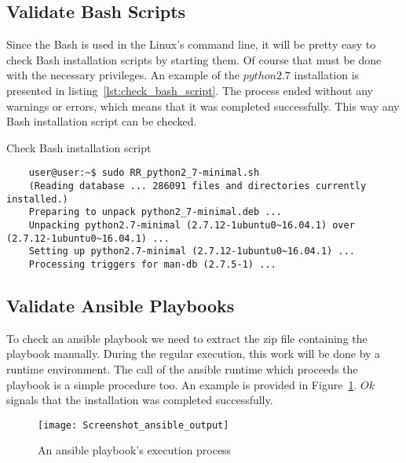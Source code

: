 \subsection*{Validate Bash Scripts}
Since the Bash is used in the Linux's command line, it will be pretty easy to check Bash installation scripts by starting them.
Of course that must be done with the necessary privileges.
An example of the $python2.7$ installation is presented in listing~\ref{lst:check_bash_script}. %
The process ended without any warnings or errors, which means that it was completed successfully.
This way any Bash installation script can be checked.
\begin{Listing}
	\caption{Check Bash installation script}
	\label{lst:check_bash_script}
	\begin{lstlisting}
	user@user:~$ sudo RR_python2_7-minimal.sh 
	(Reading database ... 286091 files and directories currently installed.)
	Preparing to unpack python2_7-minimal.deb ...
	Unpacking python2.7-minimal (2.7.12-1ubuntu0~16.04.1) over (2.7.12-1ubuntu0~16.04.1) ...
	Setting up python2.7-minimal (2.7.12-1ubuntu0~16.04.1) ...
	Processing triggers for man-db (2.7.5-1) ...
	\end{lstlisting}
\end{Listing}

\subsection*{Validate Ansible Playbooks}
To check an ansible playbook we need to extract the zip file containing the playbook manually. 
During the regular execution, this work will be done by a runtime environment.
The call of the ansible runtime which proceeds the playbook is a simple procedure too.
An example is provided in Figure~\ref{fig:ansible_output2}. %
$Ok$ signals that the installation was completed successfully.
\begin{figure}[ht]   
	\centering
	\texttt{[image: Screenshot\_ansible\_output]}
	\caption{An ansible playbook's execution process}
	\label{fig:ansible_output2}
\end{figure}